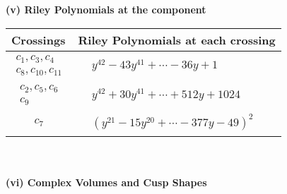 \documentclass[1p]{elsarticle_modified}
\theoremstyle{definition}
\begin{document}
\newpage\renewcommand{\arraystretch}{1}
\flushleft \textbf{(v) Riley Polynomials at the component}\newline \\
\begin{tabular}{m{50pt}|m{274pt}}
Crossings & \hspace{64pt}Riley Polynomials at each crossing \\
\hline $$\begin{aligned}c_{1},c_{3},c_{4}\\c_{8},c_{10},c_{11}\end{aligned}$$&$\begin{aligned}
&y^{42}-43 y^{41}+\cdots-36 y+1
\end{aligned}$\\
\hline $$\begin{aligned}c_{2},c_{5},c_{6}\\c_{9}\end{aligned}$$&$\begin{aligned}
&y^{42}+30 y^{41}+\cdots+512 y+1024
\end{aligned}$\\
\hline $$\begin{aligned}c_{7}\end{aligned}$$&$\begin{aligned}
&(y^{21}-15 y^{20}+\cdots-377 y-49)^{2}
\end{aligned}$\\
\hline
\end{tabular}\\~\\
\newpage\flushleft \textbf{(vi) Complex Volumes and Cusp Shapes}
\end{document}
